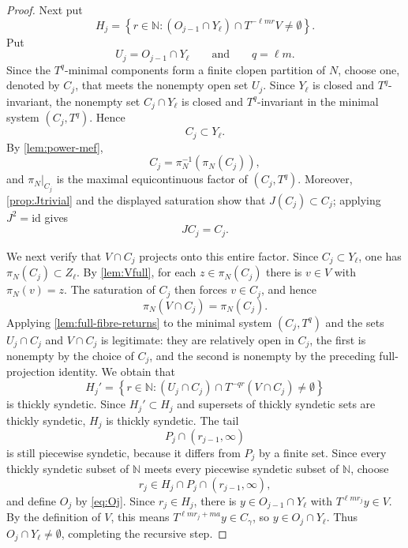 \documentclass[reqno,12pt]{amsart}
\def \N {\mathbb N}
\numberwithin{equation}{section}
\begin{document}
\begin{proof}
Next put
\begin{equation}\label{eq:Hj}
 H_j=\left\{r\in\N:
 (O_{j-1}\cap Y_\ell)\cap T^{-\ell mr}V\neq\emptyset
 \right\}.
\end{equation}
Put
\[
 U_j=O_{j-1}\cap Y_\ell
 \qquad\text{and}\qquad
 q=\ell m.
\]
Since the $T^q$-minimal components form a finite clopen partition of
$N$, choose one, denoted by $C_j$, that meets the nonempty open set
$U_j$.
Since $Y_\ell$ is closed and $T^q$-invariant, the nonempty set
$C_j\cap Y_\ell$ is closed and $T^q$-invariant in the minimal system
$(C_j,T^q)$. Hence
\[
 C_j\subset Y_\ell.
\]
By \cref{lem:power-mef},
\[
 C_j=\pi_N^{-1}(\pi_N(C_j)),
\]
and $\pi_N|_{C_j}$ is the maximal equicontinuous factor of
$(C_j,T^q)$. Moreover, \cref{prop:Jtrivial} and the displayed saturation
show that $J(C_j)\subset C_j$; applying $J^2=\mathrm{id}$ gives
\[
 JC_j=C_j.
\]

We next verify that $V\cap C_j$ projects onto this entire factor.
Since $C_j\subset Y_\ell$, one has $\pi_N(C_j)\subset Z_\ell$.
By \cref{lem:Vfull}, for each $z\in\pi_N(C_j)$ there is $v\in V$ with
$\pi_N(v)=z$. The saturation of $C_j$ then forces $v\in C_j$, and hence
\[
 \pi_N(V\cap C_j)=\pi_N(C_j).
\]
Applying \cref{lem:full-fibre-returns} to the minimal system
$(C_j,T^q)$ and the sets $U_j\cap C_j$ and $V\cap C_j$ is legitimate:
they are relatively open in $C_j$, the first is nonempty by the choice of
$C_j$, and the second is nonempty by the preceding full-projection
identity. We obtain that
\[
 H_j'=\left\{r\in\N:
 (U_j\cap C_j)\cap T^{-qr}(V\cap C_j)\neq\emptyset
 \right\}
\]
is thickly syndetic. Since $H_j'\subset H_j$ and supersets of thickly
syndetic sets are thickly syndetic, $H_j$ is thickly syndetic. The tail
\[
 P_j\cap(r_{j-1},\infty)
\]
is still piecewise syndetic, because it differs from $P_j$ by a finite
set. Since every thickly syndetic subset of $\N$ meets every piecewise
syndetic subset of $\N$, choose
\[
 r_j\in H_j\cap P_j\cap(r_{j-1},\infty),
\]
and define $O_j$ by \eqref{eq:Oj}. Since $r_j\in H_j$, there is
$y\in O_{j-1}\cap Y_\ell$ with $T^{\ell mr_j}y\in V$. By the definition
of $V$, this means $T^{\ell mr_j+ma}y\in C_\gamma$, so
$y\in O_j\cap Y_\ell$. Thus $O_j\cap Y_\ell\neq\emptyset$, completing the recursive step.


\end{proof}
\end{document}
